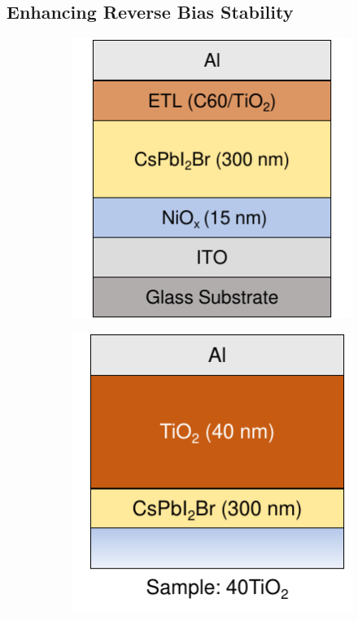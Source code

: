 \subsection{Enhancing Reverse Bias Stability}

\begin{figure}[htbp]
    \centering
    \begin{subfigure}{0.24\textwidth}
        \centering
        \includegraphics[width=\textwidth]{chapters/transport_layers/images/ETL_optimization_stack.pdf}
        \caption{}
        \label{}
    \end{subfigure}
    \hfill
    \begin{subfigure}{0.24\textwidth}
        \centering
        \includegraphics[width=\textwidth]{chapters/transport_layers/images/ETL_Optimization_40TiO2.pdf}

\end{subfigure}
\end{figure}
